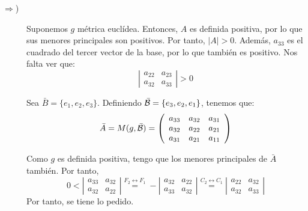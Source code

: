 \documentclass[12pt]{article}
\begin{document}
\begin{ejercicio}
\begin{enumerate}
    \begin{description}
        \item [$\Longrightarrow$)] Suponemos $g$ métrica euclídea. Entonces, $A$ es definida positiva, por lo que sus menores principales son positivos. Por tanto, $|A|>0$. Además, $a_{33}$ es el cuadrado del tercer vector de la base, por  lo que también es positivo. Nos falta ver que:
        \begin{equation*}
            \left|\begin{array}{cc}
                a_{22} & a_{23} \\
                a_{32} & a_{33}
            \end{array}\right| >0
        \end{equation*}


        Sea $\bar{B}=\{e_1,e_2,e_3\}$. Definiendo $\bar{\mathcal{B}}=\{e_3,e_2,e_1\}$, tenemos que:
        \begin{equation*}
            \bar{A}=M(g,\bar{\mathcal{B}})=\left(\begin{array}{ccc}
                a_{33} & a_{32} & a_{31} \\
                a_{32} & a_{22} & a_{21} \\
                a_{31} & a_{21} & a_{11}
            \end{array}\right)
        \end{equation*}

        Como $g$ es definida positiva, tengo que los menores principales de $\bar{A}$ también. Por tanto,
        \begin{equation*}
            0<\left|\begin{array}{cc}
                a_{33} & a_{32} \\
                a_{32} & a_{22}
            \end{array}\right|
            \stackrel{F_2\leftrightarrow F_1}{=}-
            \left|\begin{array}{cc}
                a_{32} & a_{22} \\
                a_{33} & a_{32}
            \end{array}\right|
            \stackrel{C_2\leftrightarrow C_1}{=}
            \left|\begin{array}{cc}
                a_{22} & a_{32} \\
                a_{32} & a_{33}
            \end{array}\right|
        \end{equation*}
        Por tanto, se tiene lo pedido.


\end{description}
\end{enumerate}
\end{ejercicio}
\end{document}
